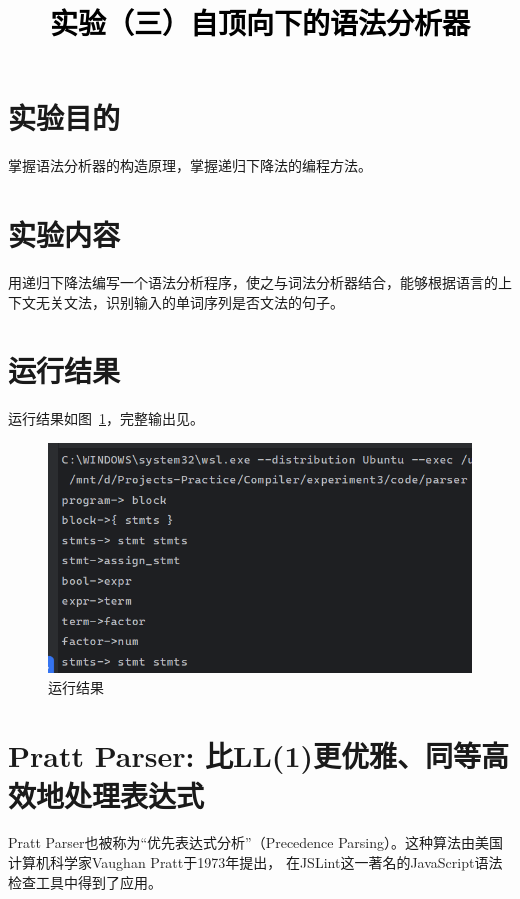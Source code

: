 \documentclass[a4paper,twoside]{article}
\newcommand{\PaperTitle}{实验（三）自顶向下的语法分析器}  %
\begin{document}
\newpage

\title{
	\Large{\textcolor{black}{\PaperTitle}}
}
	
	
\maketitle
	
\tableofcontents
 
\newpage
\setcounter{page}{1}

\begin{spacing}{1.2}

\section{实验目的}

掌握语法分析器的构造原理，掌握递归下降法的编程方法。

\section{实验内容}

用递归下降法编写一个语法分析程序，使之与词法分析器结合，能够根据语言的上下文无关文法，识别输入的单词序列是否文法的句子。

\section{运行结果}

运行结果如图~\ref{fig:output}，完整输出见。
\begin{figure}[htb]
	\centering
	\includegraphics[width=0.6\linewidth]{output.png}
	\caption{运行结果}
	\label{fig:output}
\end{figure}


\section{Pratt Parser: 比LL(1)更优雅、同等高效地处理表达式}

Pratt Parser也被称为“优先表达式分析”（Precedence Parsing）。这种算法由美国计算机科学家Vaughan Pratt于1973年提出，
在JSLint这一著名的JavaScript语法检查工具中得到了应用。


\end{spacing}
\end{document}
